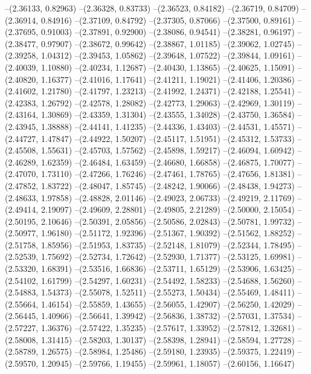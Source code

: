 --(2.36133, 0.82963)
--(2.36328, 0.83733)
--(2.36523, 0.84182)
--(2.36719, 0.84709)
--(2.36914, 0.84916)
--(2.37109, 0.84792)
--(2.37305, 0.87066)
--(2.37500, 0.89161)
--(2.37695, 0.91003)
--(2.37891, 0.92900)
--(2.38086, 0.94541)
--(2.38281, 0.96197)
--(2.38477, 0.97907)
--(2.38672, 0.99642)
--(2.38867, 1.01185)
--(2.39062, 1.02745)
--(2.39258, 1.04312)
--(2.39453, 1.05862)
--(2.39648, 1.07522)
--(2.39844, 1.09161)
--(2.40039, 1.10880)
--(2.40234, 1.12687)
--(2.40430, 1.13865)
--(2.40625, 1.15091)
--(2.40820, 1.16377)
--(2.41016, 1.17641)
--(2.41211, 1.19021)
--(2.41406, 1.20386)
--(2.41602, 1.21780)
--(2.41797, 1.23213)
--(2.41992, 1.24371)
--(2.42188, 1.25541)
--(2.42383, 1.26792)
--(2.42578, 1.28082)
--(2.42773, 1.29063)
--(2.42969, 1.30119)
--(2.43164, 1.30869)
--(2.43359, 1.31304)
--(2.43555, 1.34028)
--(2.43750, 1.36584)
--(2.43945, 1.38888)
--(2.44141, 1.41235)
--(2.44336, 1.43403)
--(2.44531, 1.45571)
--(2.44727, 1.47847)
--(2.44922, 1.50207)
--(2.45117, 1.51951)
--(2.45312, 1.53733)
--(2.45508, 1.55631)
--(2.45703, 1.57562)
--(2.45898, 1.59217)
--(2.46094, 1.60942)
--(2.46289, 1.62359)
--(2.46484, 1.63459)
--(2.46680, 1.66858)
--(2.46875, 1.70077)
--(2.47070, 1.73110)
--(2.47266, 1.76246)
--(2.47461, 1.78765)
--(2.47656, 1.81381)
--(2.47852, 1.83722)
--(2.48047, 1.85745)
--(2.48242, 1.90066)
--(2.48438, 1.94273)
--(2.48633, 1.97858)
--(2.48828, 2.01146)
--(2.49023, 2.06733)
--(2.49219, 2.11769)
--(2.49414, 2.19097)
--(2.49609, 2.28801)
--(2.49805, 2.21289)
--(2.50000, 2.15054)
--(2.50195, 2.10646)
--(2.50391, 2.05856)
--(2.50586, 2.02843)
--(2.50781, 1.99732)
--(2.50977, 1.96180)
--(2.51172, 1.92396)
--(2.51367, 1.90392)
--(2.51562, 1.88252)
--(2.51758, 1.85956)
--(2.51953, 1.83735)
--(2.52148, 1.81079)
--(2.52344, 1.78495)
--(2.52539, 1.75692)
--(2.52734, 1.72642)
--(2.52930, 1.71377)
--(2.53125, 1.69981)
--(2.53320, 1.68391)
--(2.53516, 1.66836)
--(2.53711, 1.65129)
--(2.53906, 1.63425)
--(2.54102, 1.61799)
--(2.54297, 1.60231)
--(2.54492, 1.58233)
--(2.54688, 1.56260)
--(2.54883, 1.54373)
--(2.55078, 1.52511)
--(2.55273, 1.50434)
--(2.55469, 1.48411)
--(2.55664, 1.46154)
--(2.55859, 1.43655)
--(2.56055, 1.42907)
--(2.56250, 1.42029)
--(2.56445, 1.40966)
--(2.56641, 1.39942)
--(2.56836, 1.38732)
--(2.57031, 1.37534)
--(2.57227, 1.36376)
--(2.57422, 1.35235)
--(2.57617, 1.33952)
--(2.57812, 1.32681)
--(2.58008, 1.31415)
--(2.58203, 1.30137)
--(2.58398, 1.28941)
--(2.58594, 1.27728)
--(2.58789, 1.26575)
--(2.58984, 1.25486)
--(2.59180, 1.23935)
--(2.59375, 1.22419)
--(2.59570, 1.20945)
--(2.59766, 1.19455)
--(2.59961, 1.18057)
--(2.60156, 1.16647)
